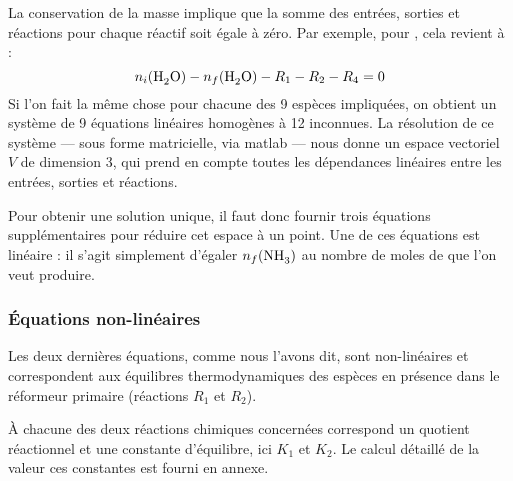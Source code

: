 La conservation de la masse implique que la somme des entrées, sorties et réactions pour chaque réactif soit égale à zéro. Par exemple, pour , cela revient à :
\[
  n_i(\ce{H2O}) - n_f(\ce{H2O}) - R_1 - R_2 - R_4 = 0
\]
Si l'on fait la même chose pour chacune des 9 espèces impliquées, on obtient un système de 9 équations linéaires homogènes à 12 inconnues. La résolution de ce système --- sous forme matricielle, via matlab --- nous donne un espace vectoriel $V$ de dimension 3, qui prend en compte toutes les dépendances linéaires entre les entrées, sorties et réactions.

Pour obtenir une solution unique, il faut donc fournir trois équations supplémentaires pour réduire cet espace à un point. Une de ces équations est linéaire : il s'agit simplement d'égaler $n_f(\ce{NH3})$ au nombre de moles de  que l'on veut produire.

\subsubsection{Équations non-linéaires}

Les deux dernières équations, comme nous l'avons dit, sont non-linéaires et correspondent aux équilibres thermodynamiques des espèces en présence dans le réformeur primaire (réactions $R_1$ et $R_2$).

À chacune des deux réactions chimiques concernées correspond un quotient réactionnel et une constante d'équilibre, ici $K_1$ et $K_2$. Le calcul détaillé de la valeur ces constantes est \TODO{} fourni en annexe.

